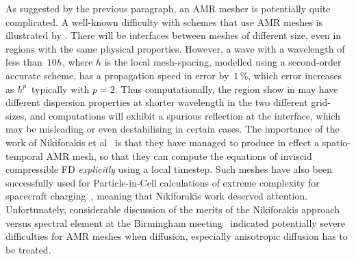 As suggested by the previous paragraph, an AMR mesher is potentially quite complicated.
A well-known difficulty with schemes that use AMR meshes is illustrated by .
There will be interfaces between meshes of different size, even in regions with
the same physical properties. However, a wave with a wavelength of less than~$10h$, where
$h$ is the local mesh-spacing, modelled using a second-order accurate scheme,
has a propagation speed in error by~$1$\,\%, which
error increases as $h^p$~typically with $p=2$. Thus computationally, the
region show in  may have different dispersion properties at
shorter wavelength in the two different grid-sizes, and computations will
exhibit a spurious reflection at the interface, which may be misleading or even
destabilising in certain cases.
The importance of the work of Nikiforakis et al~\cite{Go18Dime} is that they
have managed to produce in effect a spatio-temporal AMR mesh, so that they can
compute the equations of inviscid compressible FD \emph{explicitly} using a local timestep.
Such meshes have also been successfully used for Particle-in-Cell calculations of
extreme complexity for spacecraft charging~\cite{Mi16part}, meaning that Nikiforakis
work deserved attention. Unfortunately,
considerable discussion of the merits of the Nikiforakis approach versus spectral
element at the Birmingham meeting~\cite{y1re111b} indicated potentially severe difficulties for
AMR meshes when diffusion, especially anisotropic diffusion has to be treated.

